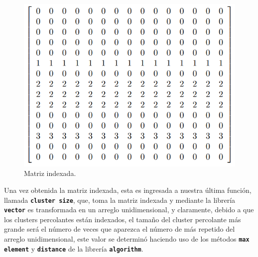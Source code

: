 \documentclass[11pt,twocolumn]{article}
\begin{document}
\begin{figure}[H]
    \centering
    \includegraphics[scale=0.41]{Imagenes/matriz4.png}
    \caption{Matriz indexada.}
    \label{index}
\end{figure}

Una vez obtenida la matriz indexada, esta es ingresada a nuestra última función, llamada \texttt{\textbf{cluster size}}, que, toma la matriz indexada y mediante la librería \textbf{\texttt{vector}} es transformada en un arreglo unidimensional, y claramente, debido a que los clusters percolantes están indexados, el tamaño del cluster percolante más grande será el número de veces que aparezca el número de más repetido del arreglo unidimensional, este valor se determinó haciendo uso de los métodos \texttt{\textbf{max element}} y \texttt{\textbf{distance}}
de la librería \texttt{\textbf{algorithm}}.

\begin{verbatim}

\end{verbatim}
\end{document}
